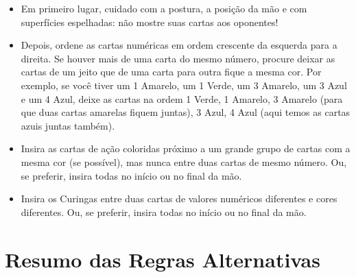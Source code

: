 \begin{itemize}
\item{Em primeiro lugar, cuidado com a postura, a posição da mão e com superfícies espelhadas: não mostre suas cartas aos oponentes!}
\item{Depois, ordene as cartas numéricas em ordem crescente da esquerda para a direita. Se houver mais de uma carta do mesmo número, procure deixar as cartas de um jeito que de uma carta para outra fique a mesma cor. Por exemplo, se você tiver um 1 Amarelo, um 1 Verde, um 3 Amarelo, um 3 Azul e um 4 Azul, deixe as cartas na ordem 1 Verde, 1 Amarelo, 3 Amarelo (para que duas cartas amarelas fiquem juntas), 3 Azul, 4 Azul (aqui temos as cartas azuis juntas também).}
\item{Insira as cartas de ação coloridas próximo a um grande grupo de cartas com a mesma cor (se possível), mas nunca entre duas cartas de mesmo número. Ou, se preferir, insira todas no início ou no final da mão.}
\item{Insira os Curingas entre duas cartas de valores numéricos diferentes e cores diferentes. Ou, se preferir, insira todas no início ou no final da mão.}
\end{itemize}

\newpage

\section{Resumo das Regras Alternativas}

